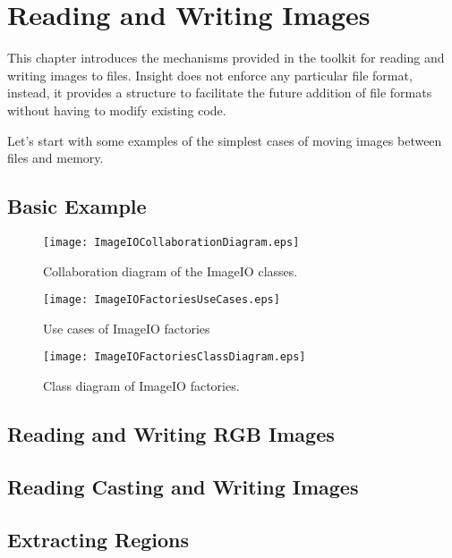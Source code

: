 

\chapter{Reading and Writing Images}
\label{sec:IO}

This chapter introduces the mechanisms provided in the toolkit for reading and
writing images to files. Insight does not enforce any particular file format,
instead, it provides a structure to facilitate the future addition of file
formats without having to modify existing code. 

Let's start with some examples of the simplest cases of moving images between files
and memory.

\section{Basic Example}
\label{sec:ImagReadWrite}



\begin{figure}
\center
\texttt{[image: ImageIOCollaborationDiagram.eps]}
\caption{Collaboration diagram of the ImageIO classes.}
\label{fig:ImageIOCollaborationDiagram}
\end{figure}

\begin{figure}
\center
\texttt{[image: ImageIOFactoriesUseCases.eps]}
\caption{Use cases of ImageIO factories}
\label{fig:ImageIOFactoriesUseCases}
\end{figure}

\begin{figure}
\center
\texttt{[image: ImageIOFactoriesClassDiagram.eps]}
\caption{Class diagram of ImageIO factories.}
\label{fig:ImageIOFactoriesClassDiagram}
\end{figure}

\section{Reading and Writing RGB Images}
\label{sec:RGBImagReadWrite}


\section{Reading Casting and Writing Images}
\label{sec:ImagReadCastWrite}


\section{Extracting Regions}
\label{sec:ImagReadExtractWrite}



